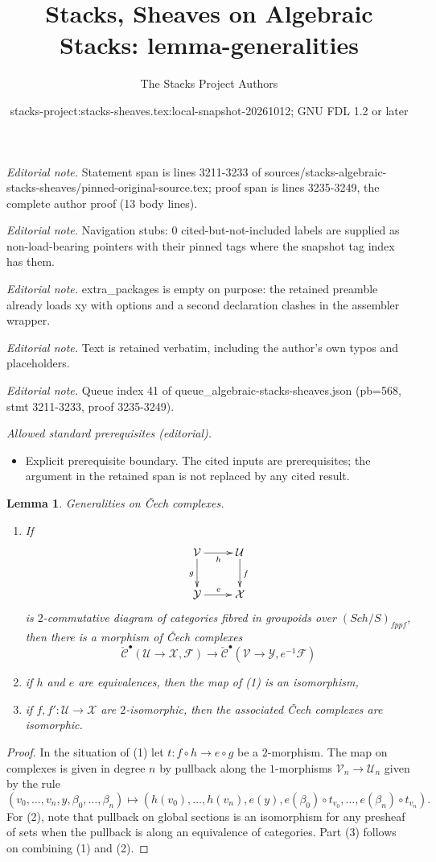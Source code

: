 \documentclass[10pt,a4paper]{amsart}
\title{Stacks, Sheaves on Algebraic Stacks: lemma-generalities}
\author{The Stacks Project Authors}
\date{stacks-project:stacks-sheaves.tex:local-snapshot-20261012; GNU FDL 1.2 or later}
\theoremstyle{plain}
\newtheorem{lemma}[subsection]{Lemma}
\theoremstyle{definition}
\theoremstyle{remark}
\numberwithin{equation}{subsection}
\def\Sch{\mathit{Sch}}
\begin{document}
\maketitle
\noindent\textit{Editorial note.} Statement span is lines 3211-3233 of sources/stacks-algebraic-stacks-sheaves/pinned-original-source.tex; proof span is lines 3235-3249, the complete author proof (13 body lines).\par\medskip
\noindent\textit{Editorial note.} Navigation stubs: 0 cited-but-not-included labels are supplied as non-load-bearing pointers with their pinned tags where the snapshot tag index has them.\par\medskip
\noindent\textit{Editorial note.} extra\_packages is empty on purpose: the retained preamble already loads xy with options and a second declaration clashes in the assembler wrapper.\par\medskip
\noindent\textit{Editorial note.} Text is retained verbatim, including the author's own typos and placeholders.\par\medskip
\noindent\textit{Editorial note.} Queue index 41 of queue\_algebraic-stacks-sheaves.json (pb=568, stmt 3211-3233, proof 3235-3249).\par\medskip
\noindent\textit{Allowed standard prerequisites (editorial).}\begin{itemize}
\item Explicit prerequisite boundary. The cited inputs are prerequisites; the argument in the retained span is not replaced by any cited result.
\end{itemize}\medskip
\begin{lemma}
\label{lemma-generalities}
Generalities on {\v C}ech complexes.
\begin{enumerate}
\item If
$$
\xymatrix{
\mathcal{V} \ar[d]_g \ar[r]_h & \mathcal{U} \ar[d]^f \\
\mathcal{Y} \ar[r]^e & \mathcal{X}
}
$$
is $2$-commutative diagram of categories fibred in groupoids over
$(\Sch/S)_{fppf}$, then there is a morphism of {\v C}ech complexes
$$
\check{\mathcal{C}}^\bullet(\mathcal{U} \to \mathcal{X}, \mathcal{F})
\longrightarrow
\check{\mathcal{C}}^\bullet(\mathcal{V} \to \mathcal{Y}, e^{-1}\mathcal{F})
$$
\item if $h$ and $e$ are equivalences, then the map of (1) is an isomorphism,
\item if $f, f' : \mathcal{U} \to \mathcal{X}$ are $2$-isomorphic, then
the associated {\v C}ech complexes are isomorphic.
\end{enumerate}
\end{lemma}

\begin{proof}
In the situation of (1) let $t : f \circ h \to e \circ g$ be a $2$-morphism.
The map on complexes is given in degree $n$ by
pullback along the $1$-morphisms
$\mathcal{V}_n \to \mathcal{U}_n$ given by the rule
$$
(v_0, \ldots, v_n, y, \beta_0, \ldots, \beta_n)
\longmapsto
(h(v_0), \ldots, h(v_n), e(y),
e(\beta_0) \circ t_{v_0}, \ldots, e(\beta_n) \circ t_{v_n}).
$$
For (2), note that pullback on global sections is an isomorphism
for any presheaf of sets when the pullback is along an equivalence
of categories. Part (3) follows on combining (1) and (2).
\end{proof}
\end{document}
